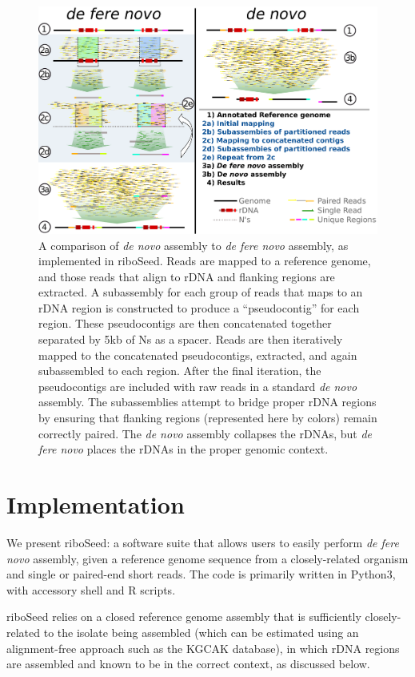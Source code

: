 \documentclass[10pt]{article}
\begin{document}
\begin{linenumbers}
\begin{figure}[!h]
  \centering
  \includegraphics[width=.8\textwidth]{riboSeed_v11}
  \caption{A comparison of \textit{de novo} assembly to \textit{de fere novo} assembly, as implemented in riboSeed. Reads are mapped to a reference genome, and those reads that align to rDNA and flanking regions are extracted. A subassembly for each group of reads that maps to an rDNA region is constructed to produce a ``pseudocontig'' for each region. These pseudocontigs are then concatenated together separated by 5kb of Ns as a spacer. Reads are then iteratively mapped to the concatenated pseudocontigs, extracted, and again subassembled to each region. After the final iteration, the pseudocontigs are included with raw reads in a standard \textit{de novo} assembly. The subassemblies attempt to bridge proper rDNA regions by ensuring that flanking regions (represented here by colors) remain correctly paired. The \textit{de novo} assembly collapses the rDNAs, but \textit{de fere novo} places the rDNAs in the proper genomic context.
  }
  \label{fig:overview}
\end{figure}




\section*{Implementation}
We present riboSeed: a software suite that allows users to easily perform \textit{de fere novo} assembly, given a reference genome sequence from a closely-related organism and single or paired-end short reads. The code is primarily written in Python3, with accessory shell and R scripts.


riboSeed relies on a closed reference genome assembly that is sufficiently closely-related to the isolate being assembled (which can be estimated using an alignment-free approach such as the KGCAK database\cite{Wang2015b}), in which rDNA regions are assembled and known to be in the correct context, as discussed below.


\end{linenumbers}
\end{document}
